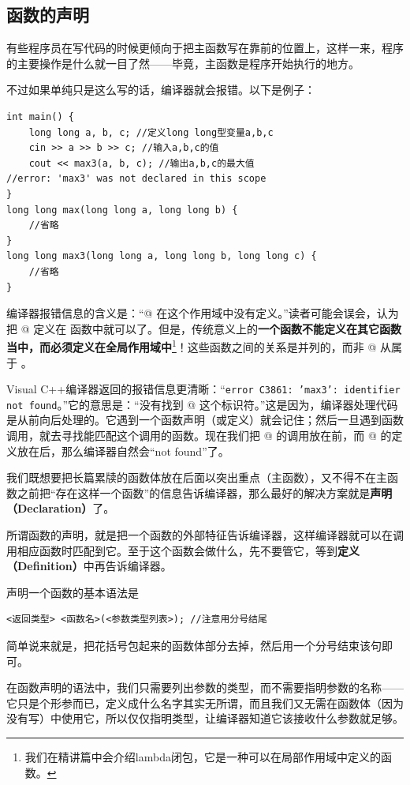 \subsection*{函数的声明}
有些程序员在写代码的时候更倾向于把主函数写在靠前的位置上，这样一来，程序的主要操作是什么就一目了然——毕竟，主函数是程序开始执行的地方。\par
不过如果单纯只是这么写的话，编译器就会报错。以下是例子：
\begin{lstlisting}
int main() {
    long long a, b, c; //定义long long型变量a,b,c
    cin >> a >> b >> c; //输入a,b,c的值
    cout << max3(a, b, c); //输出a,b,c的最大值
//error: 'max3' was not declared in this scope
}
long long max(long long a, long long b) {
    //省略
}
long long max3(long long a, long long b, long long c) {
    //省略
}
\end{lstlisting}
编译器报错信息的含义是：``@ 在这个作用域中没有定义。''读者可能会误会，认为把 @ 定义在 \lstinline@main@ 函数中就可以了。但是，传统意义上的\textbf{一个函数不能定义在其它函数当中，而必须定义在全局作用域中}\footnote{我们在精讲篇中会介绍lambda闭包，它是一种可以在局部作用域中定义的函数。}！这些函数之间的关系是并列的，而非 @ 从属于 \lstinline@main@。\par
Visual C++编译器返回的报错信息更清晰：``\texttt{error C3861: 'max3': identifier not found}。''它的意思是：``没有找到 @ 这个标识符。''这是因为，编译器处理代码是从前向后处理的。它遇到一个函数声明（或定义）就会记住；然后一旦遇到函数调用，就去寻找能匹配这个调用的函数。现在我们把 @ 的调用放在前，而 @ 的定义放在后，那么编译器自然会``not found''了。\par
我们既想要把长篇累牍的函数体放在后面以突出重点（主函数），又不得不在主函数之前把``存在这样一个函数''的信息告诉编译器，那么最好的解决方案就是\textbf{声明（Declaration）}了。\par
所谓函数的声明，就是把一个函数的外部特征告诉编译器，这样编译器就可以在调用相应函数时匹配到它。至于这个函数会做什么，先不要管它，等到\textbf{定义（Definition）}中再告诉编译器。\par
声明一个函数的基本语法是
\begin{lstlisting}
<返回类型> <函数名>(<参数类型列表>); //注意用分号结尾
\end{lstlisting}
简单说来就是，把花括号包起来的函数体部分去掉，然后用一个分号结束该句即可。\par
在函数声明的语法中，我们只需要列出参数的类型，而不需要指明参数的名称——它只是个形参而已，定义成什么名字其实无所谓，而且我们又无需在函数体（因为没有写）中使用它，所以仅仅指明类型，让编译器知道它该接收什么参数就足够。\par
